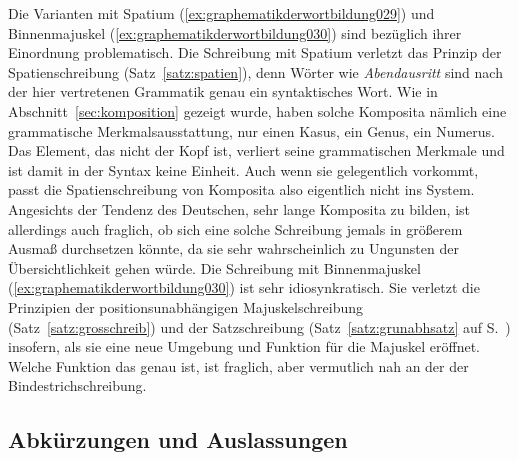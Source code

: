 Die Varianten mit Spatium (\ref{ex:graphematikderwortbildung029}) und Binnenmajuskel (\ref{ex:graphematikderwortbildung030}) sind bezüglich ihrer Einordnung problematisch.
Die Schreibung mit Spatium verletzt das Prinzip der Spatienschreibung (Satz~\ref{satz:spatien}), denn Wörter wie \textit{Abendausritt} sind nach der hier vertretenen Grammatik genau ein syntaktisches Wort.
Wie in Abschnitt~\ref{sec:komposition} gezeigt wurde, haben solche Komposita nämlich eine grammatische Merkmalsausstattung, \zB nur einen Kasus, ein Genus, ein Numerus.
Das Element, das nicht der Kopf ist, verliert seine grammatischen Merkmale und ist damit in der Syntax keine Einheit.
Auch wenn sie gelegentlich vorkommt, passt die Spatienschreibung von Komposita also eigentlich nicht ins System.
Angesichts der Tendenz des Deutschen, sehr lange Komposita zu bilden, ist allerdings auch fraglich, ob sich eine solche Schreibung jemals in größerem Ausmaß durchsetzen könnte, da sie sehr wahrscheinlich zu Ungunsten der Übersichtlichkeit gehen würde.
Die Schreibung mit Binnenmajuskel (\ref{ex:graphematikderwortbildung030}) ist sehr idiosynkratisch.
Sie verletzt die Prinzipien der positionsunabhängigen Majuskelschreibung (Satz~\ref{satz:grosschreib}) und der Satzschreibung (Satz~\ref{satz:grunabhsatz} auf S.~\pageref{satz:grunabhsatz}) insofern, als sie eine neue Umgebung und Funktion für die Majuskel eröffnet.
Welche Funktion das genau ist, ist fraglich, aber vermutlich nah an der der Bindestrichschreibung.

\subsection{Abkürzungen und Auslassungen}
\label{sec:abkuerzungenundauslassungen}

